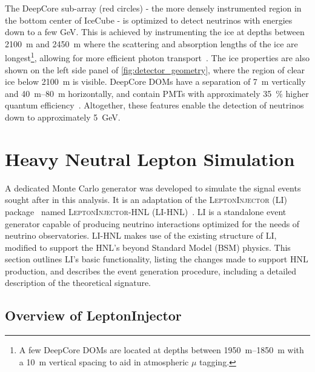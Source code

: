 \documentclass[
    aps,
    prd,
    reprint,
    amsmath,
    amssymb,
    nofootinbib,
    superscriptaddress,
    floatfix
]{revtex4-2}
\newcommand{\gev}{\giga\electronvolt}
\begin{document}
The DeepCore sub-array (red circles) - the more densely instrumented region in the bottom center of IceCube - is optimized to detect neutrinos with energies down to a few GeV. This is achieved by instrumenting the ice at depths between \SI{2100}{\m} and \SI{2450}{\m} where the scattering and absorption lengths of the ice are longest\footnote{A few DeepCore DOMs are located at depths between \SIrange{1950}{1850}{\m} with a \SI{10}{\m} vertical spacing to aid in atmospheric $\mu$ tagging.}, allowing for more efficient photon transport~\cite{ice_calibration}. The ice properties are also shown on the left side panel of \cref{fig:detector_geometry}, where the region of clear ice below \SI{2100}{\m} is visible. DeepCore DOMs have a separation of \SI{7}{\m} vertically and \SIrange{40}{80}{\m} horizontally, and contain PMTs with approximately \SI{35}{\percent} higher quantum efficiency~\cite{IceCube:2011ucd}. Altogether, these features enable the detection of neutrinos down to approximately \SI{5}{\gev}.




\section{\label{sec:generator}Heavy Neutral Lepton Simulation}

A dedicated Monte Carlo generator was developed to simulate the signal events sought after in this analysis. It is an adaptation of the \textsc{LeptonInjector} (LI) package~\cite{IceCube:2020tcq} named \textsc{LeptonInjector-HNL} (LI-HNL)~\cite{LeptonInjector-HNL}. LI is a standalone event generator capable of producing neutrino interactions optimized for the needs of neutrino observatories. LI-HNL makes use of the existing structure of LI, modified to support the HNL's beyond Standard Model (BSM) physics.
This section outlines LI's basic functionality, listing the changes made to support HNL production, and describes the event generation procedure, including a detailed description of the theoretical signature.


\subsection{Overview of LeptonInjector}
\end{document}
